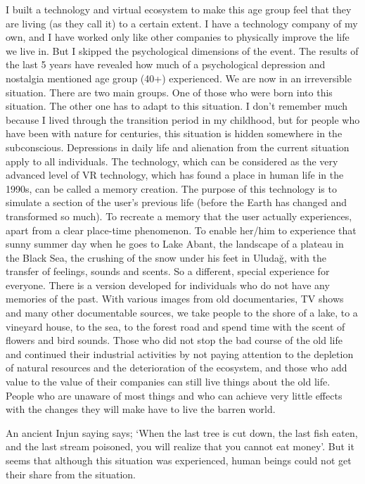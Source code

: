 \documentclass[]{book}
\begin{document}
I built a technology and virtual ecosystem to make this age group feel that they are living (as they call it) to a certain extent. I have a technology company of my own, and I have worked only like other companies to physically improve the life we live in. But I skipped the psychological dimensions of the event. The results of the last 5 years have revealed how much of a psychological depression and nostalgia mentioned age group (40+) experienced. We are now in an irreversible situation. There are two main groups. One of those who were born into this situation. The other one has to adapt to this situation. I don't remember much because I lived through the transition period in my childhood, but for people who have been with nature for centuries, this situation is hidden somewhere in the subconscious. Depressions in daily life and alienation from the current situation apply to all individuals. The technology, which can be considered as the very advanced level of VR technology, which has found a place in human life in the 1990s, can be called a memory creation. The purpose of this technology is to simulate a section of the user's previous life (before the Earth has changed and transformed so much). To recreate a memory that the user actually experiences, apart from a clear place-time phenomenon. To enable her/him to experience that sunny summer day when he goes to Lake Abant, the landscape of a plateau in the Black Sea, the crushing of the snow under his feet in Uludağ, with the transfer of feelings, sounds and scents. So a different, special experience for everyone. There is a version developed for individuals who do not have any memories of the past. With various images from old documentaries, TV shows and many other documentable sources, we take people to the shore of a lake, to a vineyard house, to the sea, to the forest road and spend time with the scent of flowers and bird sounds. Those who did not stop the bad course of the old life and continued their industrial activities by not paying attention to the depletion of natural resources and the deterioration of the ecosystem, and those who add value to the value of their companies can still live things about the old life. People who are unaware of most things and who can achieve very little effects with the changes they will make have to live the barren world.

An ancient Injun saying says; `When the last tree is cut down, the last fish eaten, and the last stream poisoned, you will realize that you cannot eat money'. But it seems that although this situation was experienced, human beings could not get their share from the situation.
\end{document}

